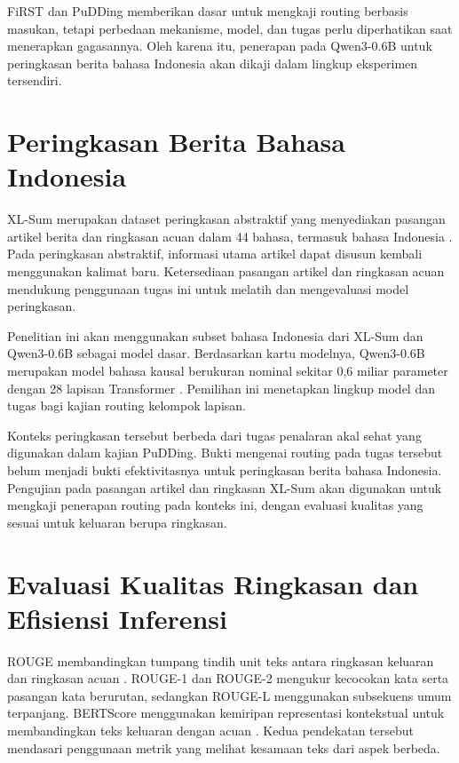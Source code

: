 FiRST dan PuDDing memberikan dasar untuk mengkaji routing berbasis masukan, tetapi perbedaan mekanisme, model, dan tugas perlu diperhatikan saat menerapkan gagasannya. Oleh karena itu, penerapan pada Qwen3-0.6B untuk peringkasan berita bahasa Indonesia akan dikaji dalam lingkup eksperimen tersendiri.

\section{Peringkasan Berita Bahasa Indonesia}

XL-Sum merupakan dataset peringkasan abstraktif yang menyediakan pasangan artikel berita dan ringkasan acuan dalam 44 bahasa, termasuk bahasa Indonesia \citep{hasan2021xlsum}. Pada peringkasan abstraktif, informasi utama artikel dapat disusun kembali menggunakan kalimat baru. Ketersediaan pasangan artikel dan ringkasan acuan mendukung penggunaan tugas ini untuk melatih dan mengevaluasi model peringkasan.

Penelitian ini akan menggunakan subset bahasa Indonesia dari XL-Sum dan Qwen3-0.6B sebagai model dasar. Berdasarkan kartu modelnya, Qwen3-0.6B merupakan model bahasa kausal berukuran nominal sekitar 0,6 miliar parameter dengan 28 lapisan Transformer \citep{qwen2025modelcard}. Pemilihan ini menetapkan lingkup model dan tugas bagi kajian routing kelompok lapisan.

Konteks peringkasan tersebut berbeda dari tugas penalaran akal sehat yang digunakan dalam kajian PuDDing. Bukti mengenai routing pada tugas tersebut belum menjadi bukti efektivitasnya untuk peringkasan berita bahasa Indonesia. Pengujian pada pasangan artikel dan ringkasan XL-Sum akan digunakan untuk mengkaji penerapan routing pada konteks ini, dengan evaluasi kualitas yang sesuai untuk keluaran berupa ringkasan.

\section{Evaluasi Kualitas Ringkasan dan Efisiensi Inferensi}

ROUGE membandingkan tumpang tindih unit teks antara ringkasan keluaran dan ringkasan acuan \citep{lin2004rouge}. ROUGE-1 dan ROUGE-2 mengukur kecocokan kata serta pasangan kata berurutan, sedangkan ROUGE-L menggunakan subsekuens umum terpanjang. BERTScore menggunakan kemiripan representasi kontekstual untuk membandingkan teks keluaran dengan acuan \citep{zhang2020bertscore}. Kedua pendekatan tersebut mendasari penggunaan metrik yang melihat kesamaan teks dari aspek berbeda.

